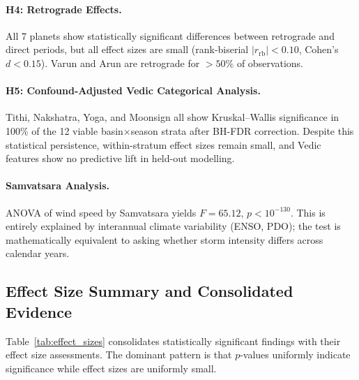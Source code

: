 \documentclass[12pt,a4paper]{article}
\begin{document}
\paragraph{H4: Retrograde Effects.}
All 7 planets show statistically significant differences between retrograde
and direct periods, but all effect sizes are small (rank-biserial
$|r_{\text{rb}}| < 0.10$, Cohen's $d < 0.15$). Varun and Arun are retrograde
for $> 50\%$ of observations.

\paragraph{H5: Confound-Adjusted Vedic Categorical Analysis.}
Tithi, Nakshatra, Yoga, and Moonsign all show Kruskal--Wallis significance in
100\% of the 12 viable basin$\times$season strata after BH-FDR correction.
Despite this statistical persistence, within-stratum effect sizes remain small,
and Vedic features show no predictive lift in held-out modelling.

\paragraph{Samvatsara Analysis.}
ANOVA of wind speed by Samvatsara yields $F = 65.12$, $p < 10^{-130}$.
This is entirely explained by interannual climate variability (ENSO, PDO);
the test is mathematically equivalent to asking whether storm intensity differs
across calendar years.

\subsection{Effect Size Summary and Consolidated Evidence}

Table~\ref{tab:effect_sizes} consolidates statistically significant findings
with their effect size assessments. The dominant pattern is that $p$-values
uniformly indicate significance while effect sizes are uniformly small.
\end{document}
